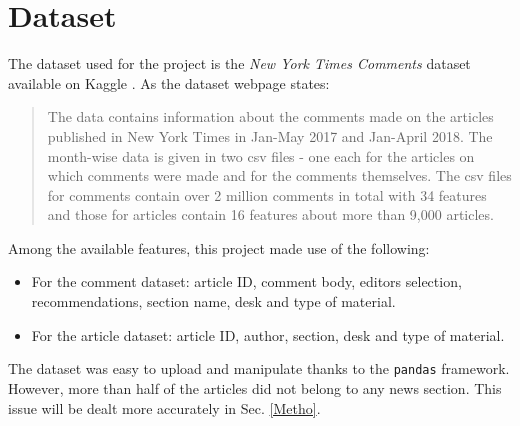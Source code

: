 \section{Dataset}

The dataset used for the project is the \textit{New York Times Comments} dataset available on Kaggle \cite{Dataset}. As the dataset webpage states:

\begin{quote}
The data contains information about the comments made on the articles published in New York Times in Jan-May 2017 and Jan-April 2018. The month-wise data is given in two csv files - one each for the articles on which comments were made and for the comments themselves. The csv files for comments contain over 2 million comments in total with 34 features and those for articles contain 16 features about more than 9,000 articles.
\end{quote}

Among the available features, this project made use of the following:
\begin{itemize}
\item For the comment dataset: article ID, comment body, editors selection, recommendations, section name, desk and type of material.
\item For the article dataset: article ID, author, section, desk and type of material.
\end{itemize}

The dataset was easy to upload and manipulate thanks to the {\tt pandas} framework. However, more than half of the articles did not belong to any news section. This issue will be dealt more accurately in Sec. \ref{Metho}. 